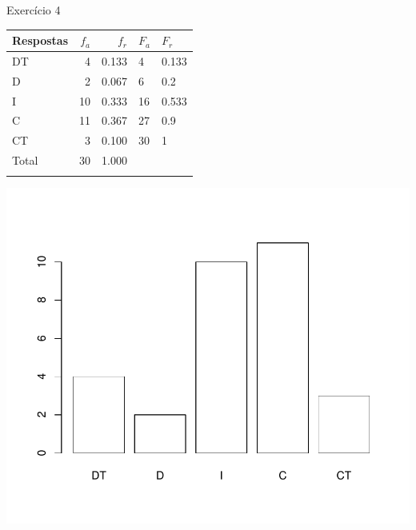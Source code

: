 \documentclass[
  ignorenonframetext,
  serif,
  professionalfont,
  usenames,
  dvipsnames,
  aspectratio = 169]{beamer}
\def\beginAHalfColumn{\begin{minipage}{0.49\textwidth}}%
\def\endColumns{\end{minipage}}%
\begin{document}
\begin{frame}{Exercício 4}
\label{exercuxedcio-4-2}
\beginAHalfColumn

\begin{longtable}[]{@{}lrrll@{}}
\toprule\noalign{}
Respostas & \(f_a\) & \(f_r\) & \(F_{a}\) & \(F_{r}\) \\
\midrule\noalign{}
\endhead
DT & 4 & 0.133 & 4 & 0.133 \\
D & 2 & 0.067 & 6 & 0.2 \\
I & 10 & 0.333 & 16 & 0.533 \\
C & 11 & 0.367 & 27 & 0.9 \\
CT & 3 & 0.100 & 30 & 1 \\
Total & 30 & 1.000 & & \\
\bottomrule\noalign{}
\end{longtable}

\endColumns
\beginAHalfColumn

\begin{center}\includegraphics[width=0.9\linewidth]{exercicios-encontro1-solucao_files/figure-beamer/unnamed-chunk-11-1} \end{center}

\endColumns
\end{frame}
\end{document}
